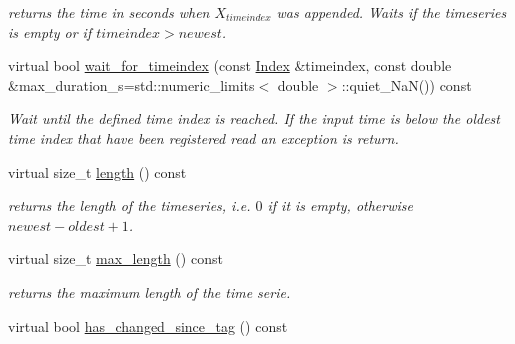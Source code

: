 \begin{DoxyCompactItemize}
\begin{DoxyCompactList}\small\item\em returns the time in seconds when $ X_{timeindex} $ was appended. Waits if the timeseries is empty or if $timeindex > newest $. \end{DoxyCompactList}\item 
virtual bool \hyperlink{classreal__time__tools_1_1ThreadsafeTimeseries_ac6cee8cdf659da4a25de6a269648cf4e}{wait\+\_\+for\+\_\+timeindex} (const \hyperlink{classreal__time__tools_1_1ThreadsafeTimeseries_a9364696c534468d7ad927883b16ca981}{Index} \&timeindex, const double \&max\+\_\+duration\+\_\+s=std\+::numeric\+\_\+limits$<$ double $>$\+::quiet\+\_\+\+NaN()) const \hypertarget{classreal__time__tools_1_1ThreadsafeTimeseries_ac6cee8cdf659da4a25de6a269648cf4e}{}\label{classreal__time__tools_1_1ThreadsafeTimeseries_ac6cee8cdf659da4a25de6a269648cf4e}

\begin{DoxyCompactList}\small\item\em Wait until the defined time index is reached. If the input time is below the oldest time index that have been registered read an exception is return. \end{DoxyCompactList}\item 
virtual size\+\_\+t \hyperlink{classreal__time__tools_1_1ThreadsafeTimeseries_a7ed15c2faf8b304f8f6ef97e9cd31020}{length} () const \hypertarget{classreal__time__tools_1_1ThreadsafeTimeseries_a7ed15c2faf8b304f8f6ef97e9cd31020}{}\label{classreal__time__tools_1_1ThreadsafeTimeseries_a7ed15c2faf8b304f8f6ef97e9cd31020}

\begin{DoxyCompactList}\small\item\em returns the length of the timeseries, i.\+e. $0$ if it is empty, otherwise $newest - oldest +1 $. \end{DoxyCompactList}\item 
virtual size\+\_\+t \hyperlink{classreal__time__tools_1_1ThreadsafeTimeseries_a4d1fd7d17f1c896a81ea62923591dbc4}{max\+\_\+length} () const 
\begin{DoxyCompactList}\small\item\em returns the maximum length of the time serie. \end{DoxyCompactList}\item 
virtual bool \hyperlink{classreal__time__tools_1_1ThreadsafeTimeseries_ab9adfbafe82cd0dae68d1ba3607f5ecb}{has\+\_\+changed\+\_\+since\+\_\+tag} () const \hypertarget{classreal__time__tools_1_1ThreadsafeTimeseries_ab9adfbafe82cd0dae68d1ba3607f5ecb}{}\label{classreal__time__tools_1_1ThreadsafeTimeseries_ab9adfbafe82cd0dae68d1ba3607f5ecb}


\end{DoxyCompactItemize}
